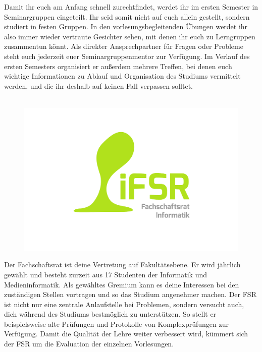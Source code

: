 
Damit ihr euch am Anfang schnell zurechtfindet, werdet ihr im ersten Semester in Seminargruppen eingeteilt.
Ihr seid somit nicht auf euch allein gestellt, sondern studiert in festen Gruppen.
In den vorlesungsbegleitenden Übungen werdet ihr also immer wieder vertraute Gesichter sehen, mit denen ihr euch zu Lerngruppen zusammentun könnt.
Als direkter Ansprechpartner für Fragen oder Probleme steht euch jederzeit euer Seminargruppenmentor zur Verfügung.
Im Verlauf des ersten Semesters organisiert er außerdem mehrere Treffen, bei denen euch wichtige Informationen zu Ablauf und Organisation des Studiums vermittelt werden, und die ihr deshalb auf keinen Fall verpassen solltet.

\begin{figure}\ \\[-1cm]
\flushright\includegraphics[width=\linewidth, trim=160 100 150 100, clip]{img/fsr_logo}
\end{figure}

Der Fachschaftsrat ist deine Vertretung auf Fakultätsebene.
Er wird jährlich gewählt und besteht zurzeit aus 17 Studenten der Informatik und Medieninformatik.
Als gewähltes Gremium kann es deine Interessen bei den zuständigen Stellen vortragen und so das Studium angenehmer machen.
Der FSR ist nicht nur eine zentrale Anlaufstelle bei Problemen, sondern versucht auch, dich während des Studiums bestmöglich zu unterstützen.
So stellt er beispielsweise alte Prüfungen und Protokolle von Komplexprüfungen zur Verfügung.
Damit die Qualität der Lehre weiter verbessert wird, kümmert sich der FSR um die Evaluation der einzelnen Vorlesungen.

